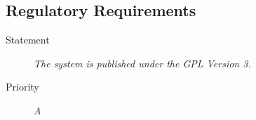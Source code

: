 \subsection{Regulatory Requirements}

\NFR
\begin{description}
\item[Statement] \textit{The system is published under the GPL Version 3.}
\item[Priority] \textit{A}
\end{description}

